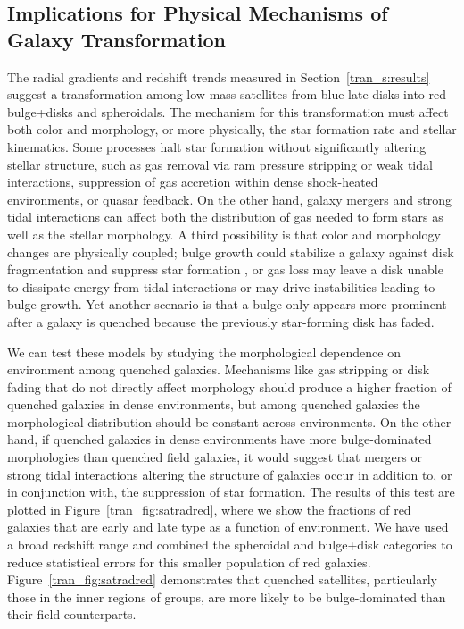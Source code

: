 \subsection{Implications for Physical Mechanisms of Galaxy Transformation}

The radial gradients and redshift trends measured in
Section~\ref{tran_s:results} suggest a transformation among low mass
satellites from blue late disks into red bulge+disks and spheroidals.
The mechanism for this transformation must affect both color and
morphology, or more physically, the star formation rate and stellar
kinematics. Some processes \citep[see e.g.][for a review]{Boselli2006}
halt star formation without significantly altering stellar structure,
such as gas removal via ram pressure stripping or weak tidal
interactions, suppression of gas accretion within dense
shock-heated environments, or quasar feedback. On the other hand, galaxy mergers and
strong tidal interactions can affect both the distribution of gas
needed to form stars as well as the stellar morphology. A third
possibility is that color and morphology changes are physically
coupled; bulge growth could stabilize a galaxy against
  disk fragmentation and suppress star formation \citep{Martig2009},
  or gas loss may leave a disk unable to dissipate energy from tidal
  interactions or may drive instabilities leading to bulge growth.
Yet another scenario is that a bulge only appears more prominent after
a galaxy is quenched because the previously star-forming disk has
faded.

We can test these models by studying the morphological dependence on
environment among quenched galaxies. Mechanisms like gas stripping or
disk fading that do not directly affect morphology should produce a
higher fraction of quenched galaxies in dense environments, but among
quenched galaxies the morphological distribution should be
constant across environments. On the other hand, if quenched galaxies in dense
environments have more bulge-dominated morphologies than quenched
field galaxies, it would suggest that mergers or strong tidal
interactions altering the structure of galaxies occur in addition to,
or in conjunction with, the suppression of star formation. The results
of this test are plotted in Figure~\ref{tran_fig:satradred}, where we show
the fractions of red galaxies that are early and late type as a
function of environment. We have used a broad redshift range and
combined the spheroidal and bulge+disk categories to reduce
statistical errors for this smaller population of red
galaxies. Figure~\ref{tran_fig:satradred} demonstrates that quenched
satellites, particularly those in the inner regions of groups, are
more likely to be bulge-dominated than their field
counterparts. 

